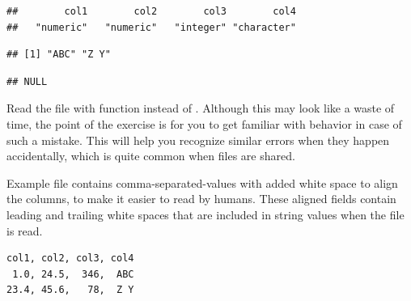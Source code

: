 \documentclass[krantz2]{krantz}\usepackage{knitr}
\begin{document}
\begin{knitrout}\footnotesize
{}\color{fgcolor}\begin{kframe}
\begin{alltt}
\end{alltt}
\begin{verbatim}
##        col1        col2        col3        col4 
##   "numeric"   "numeric"   "integer" "character"
\end{verbatim}
\begin{alltt}
\hlstd{from_csv_a.df[[}\hlstd{]]}
\end{alltt}
\begin{verbatim}
## [1] "ABC" "Z Y"
\end{verbatim}
\begin{alltt}
\hlstd{(from_csv_a.df[[}\hlstd{]])}
\end{alltt}
\begin{verbatim}
## NULL
\end{verbatim}
\end{kframe}
\end{knitrout}

\begin{playground}
Read the file  with function  instead of . Although this may look like a waste of time, the point of the exercise is for you to get familiar with \Rlang behavior in case of such a mistake. This will help you recognize similar errors when they happen accidentally, which is quite common when files are shared.
\end{playground}

Example file  contains comma-separated-values with added white space to align the columns, to make it easier to read by humans. These aligned fields contain leading and trailing white spaces that are included in string values when the file is read.

\begin{knitrout}\footnotesize
{}\color{fgcolor}\begin{kframe}
\begin{verbatim}
col1, col2, col3, col4
 1.0, 24.5,  346,  ABC
23.4, 45.6,   78,  Z Y
\end{verbatim}
\end{kframe}
\end{knitrout}
\end{document}
